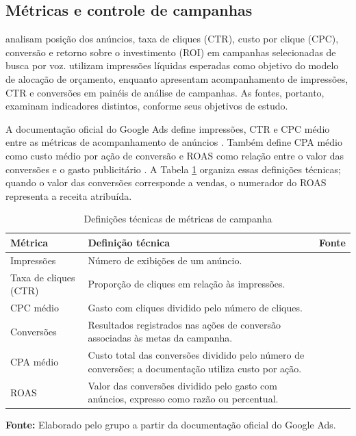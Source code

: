 \subsection{\esp Métricas e controle de campanhas}

 analisam posição dos anúncios, taxa de cliques (CTR), custo por clique (CPC), conversão e retorno sobre o investimento (ROI) em campanhas selecionadas de busca por voz.  utilizam impressões líquidas esperadas como objetivo do modelo de alocação de orçamento, enquanto  apresentam acompanhamento de impressões, CTR e conversões em painéis de análise de campanhas. As fontes, portanto, examinam indicadores distintos, conforme seus objetivos de estudo.

A documentação oficial do Google Ads define impressões, CTR e CPC médio entre as métricas de acompanhamento de anúncios \cite{googlemetricas}. Também define CPA médio como custo médio por ação de conversão e ROAS como relação entre o valor das conversões e o gasto publicitário \cite{googlecpa,googleroas}. A Tabela \ref{tab:metricas-campanha} organiza essas definições técnicas; quando o valor das conversões corresponde a vendas, o numerador do ROAS representa a receita atribuída.

\begin{table}[H]
\centering
\caption{Definições técnicas de métricas de campanha}
\label{tab:metricas-campanha}
\small
\begin{tabular}{p{}p{}p{}}
\hline
\textbf{Métrica} & \textbf{Definição técnica} & \textbf{Fonte} \\
\hline
Impressões & Número de exibições de um anúncio. & \cite{googlemetricas} \\
Taxa de cliques (CTR) & Proporção de cliques em relação às impressões. & \cite{googlemetricas} \\
CPC médio & Gasto com cliques dividido pelo número de cliques. & \cite{googlemetricas} \\
Conversões & Resultados registrados nas ações de conversão associadas às metas da campanha. & \cite{googlemetricas} \\
CPA médio & Custo total das conversões dividido pelo número de conversões; a documentação utiliza custo por ação. & \cite{googlecpa} \\
ROAS & Valor das conversões dividido pelo gasto com anúncios, expresso como razão ou percentual. & \cite{googleroas} \\
\hline
\end{tabular}
\par\footnotesize\textbf{Fonte:} Elaborado pelo grupo a partir da documentação oficial do Google Ads.
\end{table}

